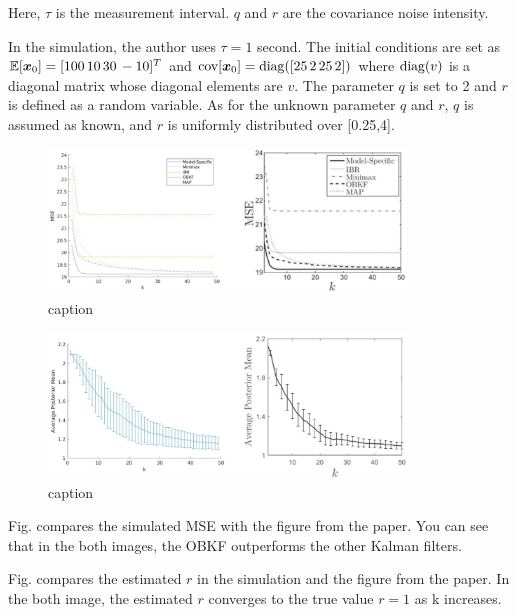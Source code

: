 Here, $\tau$ is the measurement interval. $q$ and $r$ are the covariance noise intensity.

In the simulation, the author uses $\tau = 1$ second. The initial conditions are set as $\mathbb{E}[\bm{x}_0]=[100\, 10\, 30\, -10]^T$ and ${\rm cov}[\bm{x}_0]={\rm diag}([25\, 2\, 25\, 2])$ where ${\rm diag}(v)$ is a diagonal matrix whose diagonal elements are $v$.
The parameter $q$ is set to 2 and $r$ is defined as a random variable. As for the unknown parameter $q$ and $r$, $q$ is assumed as known, and $r$ is uniformly distributed over [0.25,4]. 

\begin{figure}[H]
    \begin{center}
    \includegraphics[width=9.5cm]{img/r1_mse.eps}
    \caption{caption}
    \label{fig:label}
    \end{center}
\end{figure}

\begin{figure}[H]
    \begin{center}
    \includegraphics[width=9.5cm]{img/r1_mean.eps}
    \caption{caption}
    \label{fig:label}
    \end{center}
\end{figure}

Fig. compares the simulated MSE with the figure from the paper. You can see that in the both images, the OBKF outperforms the other Kalman filters.

Fig. compares the estimated $r$ in the simulation and the figure from the paper. In the both image, the estimated $r$ converges to the true value $r=1$ as k increases.
